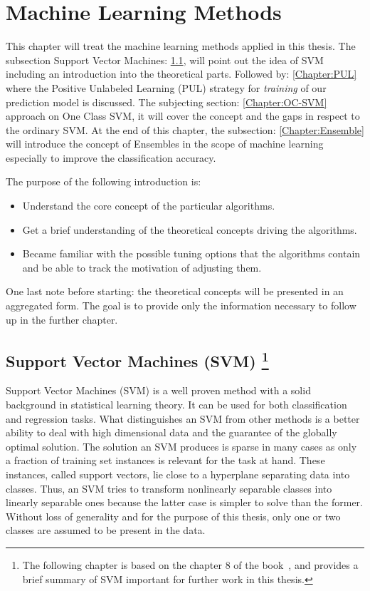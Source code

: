 \chapter{Machine Learning Methods}\label{ch:3}
This chapter will treat the machine learning methods applied in this thesis. The subsection Support Vector Machines: \ref{Chapter:SVM}, will point out the idea of SVM including an introduction into the theoretical parts. Followed by: \ref{Chapter:PUL} where the Positive Unlabeled Learning (PUL) strategy for \textit{training} of our prediction model is discussed. The subjecting section: \ref{Chapter:OC-SVM} approach on One Class SVM, it will cover the concept and the gaps in respect to the ordinary SVM. At the end of this chapter, the subsection: \ref{Chapter:Ensemble} will introduce the concept of Ensembles in the scope of machine learning especially to improve the classification accuracy.

The purpose of the following introduction is:
\begin{itemize}
    \item Understand the core concept of the particular algorithms.
    
    \item Get a brief understanding of the theoretical concepts driving the algorithms.
    
    \item Became familiar with the possible tuning options that the algorithms contain and be able to track the motivation of adjusting them.
\end{itemize}
One last note before starting: the theoretical concepts will be presented in an aggregated form. The goal is to provide only the information necessary to follow up in the further chapter. 


\section[Support Vector Machines (SVM)] {Support Vector Machines (SVM) \footnote{The following chapter is based on the chapter 8 of the book~\cite{Okun;Valentini:2009}, and provides a brief summary of SVM important for further work in this thesis. } }\label{Chapter:SVM}

Support Vector Machines (SVM) \cite{Cortes;Vapnik:1995} is a well proven method with a solid background in statistical learning theory. It can be used for both classification and regression tasks. What distinguishes an SVM from other methods is a better ability to deal with high dimensional data and the guarantee of the globally optimal solution. The solution an SVM produces is sparse in many cases as only a fraction of training set instances is relevant for the task at hand. These instances, called support vectors, lie close to a hyperplane separating data into classes. Thus, an SVM tries to transform nonlinearly separable classes into linearly separable ones because the latter case is simpler to solve than the former. Without loss of generality and for the purpose of this thesis, only one or two classes are assumed to be present in the data.

